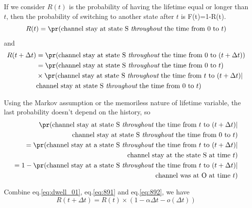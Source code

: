 If we consider $R(t)$ is the probability of having the lifetime equal or longer
than $t$, then the probability of switching to another state after $t$ is
F(t)=1-R(t).
\begin{equation}
  \label{eq:890}
  R(t) = \pr(\text{channel stay at state S {\it throughout} the time from
    0 to $t$})
\end{equation}
and
\begin{equation}
  \label{eq:891}
  \begin{split}
    R(t+\Delta t) &=
    \pr(\text{channel stay at state S {\it throughout} the time from
      0 to $(t+\Delta t)$}) \\
    &=
    \pr(\text{channel stay at state S {\it throughout} the time from 0
      to $t$}) \\
    &\times
    \pr(\text{channel stay at state S {\it throughout} the time from
      $t$ to $(t+\Delta t)$}| \\
    &\text{channel stay at state S {\it throughout} the time from 0
      to $t$}) \\
  \end{split}
\end{equation}


Using the Markov assumption or the memoriless nature of lifetime variable, the
last probability doesn't depend on the history, so
\begin{equation}
  \label{eq:892}
  \begin{split}
    \pr(\text{channel stay at state S {\it throughout} the time from
      $t$ to $(t+\Delta t)$}| \\
    \text{channel stay at state S {\it throughout} the time from 0
      to $t$})  \\
  =  \pr(\text{channel stay at a state S {\it throughout} the time from
      $t$ to $(t+\Delta t)$}| \\
    \text{channel stay at the state S at time $t$}) \\
  = 1 - \pr(\text{channel stay at a state S {\it throughout} the time from
      $t$ to $(t+\Delta t)$}| \\
    \text{channel was at O at time $t$})
  \end{split}
\end{equation}

Combine eq.\ref{eq:dwell_01}, eq.\ref{eq:891} and eq.\ref{eq:892}, we have
\begin{equation}
  \label{eq:894}
  R(t+\Delta t) = R(t) \times (1-\alpha \Delta t - o(\Delta t))
\end{equation}

